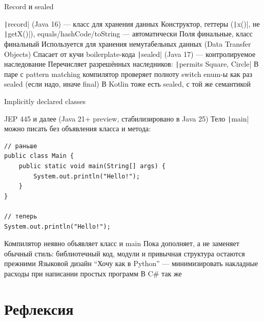 \documentclass{../../slides-style}
\begin{document}
    \begin{frame}{Record и sealed}
        \begin{outline}
            \1 \texttt|record| (Java 16) --- класс для хранения данных
                \2 Конструктор, геттеры (\texttt|x()|, не \texttt|getX()|), equals/hashCode/toString --- автоматически
                \2 Поля финальные, класс финальный
                \2 Используется для хранения немутабельных данных (Data Transfer Objects)
                \2 Спасает от кучи boilerplate-кода
            \1 \texttt|sealed| (Java 17) --- контролируемое наследование
                \2 Перечисляет разрешённых наследников: \texttt|permits Square, Circle|
                \2 В паре с pattern matching компилятор проверяет полноту switch
                \2 enum-ы как раз sealed (если надо, иначе final)
                \2 В Kotlin тоже есть sealed, с той же семантикой
        \end{outline}
    \end{frame}

    \begin{frame}[fragile]{Implicitly declared classes}
        \begin{outline}
            \1 JEP 445 и далее (Java 21+ preview, стабилизировано в Java 25)
            \1 Тело \texttt|main| можно писать без объявления класса и метода:
                \begin{footnotesize}
                    \begin{verbatim}
// раньше
public class Main {
    public static void main(String[] args) {
        System.out.println("Hello!");
    }
}

// теперь
System.out.println("Hello!");
                    \end{verbatim}
                \end{footnotesize}
            \1 Компилятор неявно объявляет класс и main
            \1 Пока дополняет, а не заменяет обычный стиль: библиотечный код, модули и привычная структура остаются прежними
            \1 Языковой дизайн \enquote{Хочу как в Python} --- минимизировать накладные расходы при написании простых программ
                \2 В C\# так же
        \end{outline}
    \end{frame}

    \section{Рефлексия}
\end{document}
